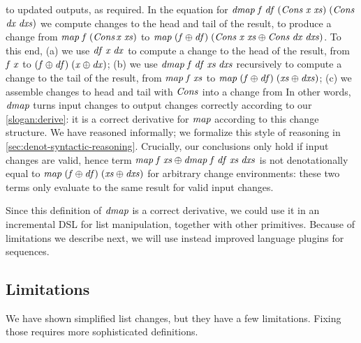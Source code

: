 to updated outputs, as required.
In the equation for \ensuremath{\Varid{dmap}\;\Varid{f}\;\Varid{df}\;(\Conid{Cons}\;\Varid{x}\;\Varid{xs})\;(\Conid{Cons}}\linebreak\ensuremath{\Varid{dx}\;\Varid{dxs})} we compute changes to
the head and tail of the result, to produce a change from
\ensuremath{\Varid{map}\;\Varid{f}\;(\Conid{Cons}}\linebreak\ensuremath{\Varid{x}\;\Varid{xs})} to \ensuremath{\Varid{map}\;(\Varid{f}\oplus \Varid{df})\;(\Conid{Cons}\;\Varid{x}\;\Varid{xs}\oplus \Conid{Cons}\;\Varid{dx}\;\Varid{dxs})}. To
this end,
(a) we use \ensuremath{\Varid{df}\;\Varid{x}\;\Varid{dx}} to compute a
change to the head of the result, from \ensuremath{\Varid{f}\;\Varid{x}} to \ensuremath{(\Varid{f}\oplus \Varid{df})\;(\Varid{x}\oplus \Varid{dx})};
(b) we use \ensuremath{\Varid{dmap}\;\Varid{f}\;\Varid{df}\;\Varid{xs}\;\Varid{dxs}} recursively to compute a change to the tail of the
result, from \ensuremath{\Varid{map}\;\Varid{f}\;\Varid{xs}} to \ensuremath{\Varid{map}\;(\Varid{f}\oplus \Varid{df})\;(\Varid{xs}\oplus \Varid{dxs})};
(c) we assemble changes to head and tail with \ensuremath{\Conid{Cons}} into a change from
In other words, \ensuremath{\Varid{dmap}} turns input changes to output changes correctly according
to our \cref{slogan:derive}: it is a correct derivative for \ensuremath{\Varid{map}} according to
this change structure.
We have reasoned informally; we formalize this
style of reasoning in \cref{sec:denot-syntactic-reasoning}. Crucially, our
conclusions only hold if input changes are valid, hence term \ensuremath{\Varid{map}\;\Varid{f}\;\Varid{xs}\oplus \Varid{dmap}\;\Varid{f}\;\Varid{df}\;\Varid{xs}\;\Varid{dxs}} is not denotationally equal to \ensuremath{\Varid{map}\;(\Varid{f}\oplus \Varid{df})\;(\Varid{xs}\oplus \Varid{dxs})}
for arbitrary change environments:
these two terms only evaluate to the same result for valid input changes.

Since this definition of \ensuremath{\Varid{dmap}} is a correct derivative, we could use it in an incremental DSL for
list manipulation, together with other primitives. Because of limitations we
describe next, we will use instead improved language plugins for sequences.

\subsection{Limitations}
We have shown simplified list changes, but they have a few limitations. Fixing
those requires more sophisticated definitions.

